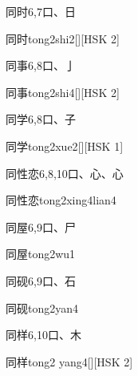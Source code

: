 \begin{entry}{同时}{6,7}{⼝、⽇}
  \begin{phonetics}{同时}{tong2shi2}[][HSK 2]
  \end{phonetics}
\end{entry}

\begin{entry}{同事}{6,8}{⼝、⼅}
  \begin{phonetics}{同事}{tong2shi4}[][HSK 2]
  \end{phonetics}
\end{entry}

\begin{entry}{同学}{6,8}{⼝、⼦}
  \begin{phonetics}{同学}{tong2xue2}[][HSK 1]
  \end{phonetics}
\end{entry}

\begin{entry}{同性恋}{6,8,10}{⼝、⼼、⼼}
  \begin{phonetics}{同性恋}{tong2xing4lian4}
  \end{phonetics}
\end{entry}

\begin{entry}{同屋}{6,9}{⼝、⼫}
  \begin{phonetics}{同屋}{tong2wu1}
  \end{phonetics}
\end{entry}

\begin{entry}{同砚}{6,9}{⼝、⽯}
  \begin{phonetics}{同砚}{tong2yan4}
  \end{phonetics}
\end{entry}

\begin{entry}{同样}{6,10}{⼝、⽊}
  \begin{phonetics}{同样}{tong2 yang4}[][HSK 2]
  \end{phonetics}
\end{entry}

